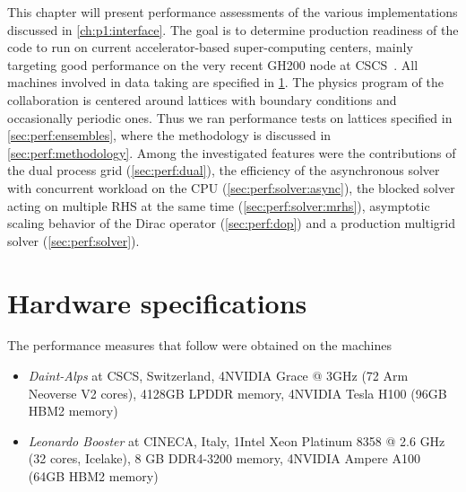 This chapter will present performance assessments of the various implementations discussed in \cref{ch:p1:interface}.
The goal is to determine production readiness of the code to run on current accelerator-based super-computing centers, mainly targeting good performance on the very recent GH200 node at CSCS~\cite{fusco2024}.
All machines involved in data taking are specified in \cref{sec:perf:hardware}.
The physics program of the \RCstar collaboration is centered around lattices with \Cstar boundary conditions and occasionally periodic ones.
Thus we ran performance tests on lattices specified in \cref{sec:perf:ensembles}, where the methodology is discussed in \cref{sec:perf:methodology}.
Among the investigated features were the contributions of the dual process grid (\cref{sec:perf:dual}), the efficiency of the asynchronous solver with concurrent workload on the CPU (\cref{sec:perf:solver:async}), the blocked solver acting on multiple RHS at the same time (\cref{sec:perf:solver:mrhs}), asymptotic scaling behavior of the Dirac operator (\cref{sec:perf:dop}) and a production multigrid solver (\cref{sec:perf:solver}).

\section{Hardware specifications}
\label{sec:perf:hardware}

\newcommand{\datataking}[1]{The data was taken on \emph{#1}, see \cref{sec:perf:hardware}.}

The performance measures that follow were obtained on the machines
\begin{itemize}
    \item \emph{Daint-Alps} at CSCS, Switzerland, 4\x NVIDIA\textsuperscript{\textregistered} Grace @ 3GHz (72 Arm Neoverse V2 cores), 4\x 128GB LPDDR memory, 4\x NVIDIA\textsuperscript{\textregistered} Tesla\textsuperscript{\textregistered} H100 (96GB HBM2 memory)
    \item \emph{Leonardo Booster} at CINECA, Italy, 1\x Intel\textsuperscript{\textregistered} Xeon\textsuperscript{\textregistered} Platinum 8358 @ 2.6 GHz (32 cores, Icelake), 8 GB DDR4-3200 memory, 4\x NVIDIA\textsuperscript{\textregistered} Ampere A100 (64GB HBM2 memory)~\cite{leonardo:booster}
\end{itemize}

